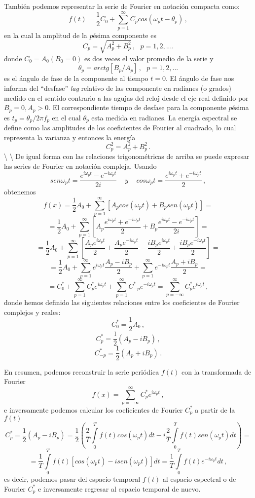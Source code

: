 \documentclass[
]{agujournal2019}
\begin{document}
También podemos representar la serie de Fourier en notación compacta
como:
\[f(t)=\frac{1}{2}C_0 +\sum\limits^\infty_{p=1}C_p cos(\omega_p t - \theta_p)\,,\]
en la cual la amplitud de la \(p\)ésima componente es
\[C_p=\sqrt{A_p^2+B_p^2}\,,\,\,\,\,p=1,2,....\] donde
\(C_0=A_0 (B_0=0)\) es dos veces el valor promedio de la serie y
\[\theta_p=arctg[B_p/A_p]\,,\,\,\,\,p=1,2,...\] es el ángulo de fase de
la componente al tiempo \(t=0\). El ángulo de fase nos informa del
``desfase'' \emph{lag} relativo de las componente en radianes (o grados)
medido en el sentido contrario a las agujas del reloj desde el eje real
definido por \(B_p=0, A_p>0\). El correspondiente tiempo de desfase para
la componente \(p\)ésima es \(t_p=\theta_p/2\pi f_p\) en el cual
\(\theta_p\) esta medida en radianes. La energía espectral se define
como las amplitudes de los coeficientes de Fourier al cuadrado, lo cual
representa la varianza y entonces la energía \[C^2_p=A_p^2 + B_p^2\,.\]
\textbackslash{} \textbackslash{} De igual forma con las relaciones
trigonométricas de arriba se puede expresar las series de Fourier en
notación compleja. Usando
\[sen\omega_p t=\frac{e^{i\omega_pt}-e^{-i\omega_pt}}{2i}\,\,\,\,\,\,\,y\,\,\,\,\,\,\,
cos\omega_p t=\frac{e^{i\omega_pt}+e^{-i\omega_pt}}{2}\,,\] obtenemos
\[f(x)=\frac{1}{2}A_0 +\sum\limits^\infty_{p=1}[A_p cos(\omega_p t) + B_p sen(\omega_p t)]=\]
\[=\frac{1}{2}A_0 +\sum\limits^\infty_{p=1}\left[ A_p \frac{e^{i\omega_pt}+e^{-i\omega_pt}}{2} + B_p \frac{e^{i\omega_pt}-e^{-i\omega_pt}}{2i}\right]=\]
\[=\frac{1}{2}A_0+\sum\limits^\infty_{p=1}\left[\frac{A_p e^{i\omega_p t}}{2} + \frac{A_p e^{-i\omega_p t}}{2} -
\frac{iB_p e^{i\omega_p t}}{2} + \frac{iB_p e^{-i\omega_p t}}{2} \right]=\]
\[=\frac{1}{2}A_0+\sum\limits^\infty_{p=1} e^{i\omega_p t}\frac{A_p-iB_p}{2} +
                  \sum\limits^\infty_{p=1} e^{-i\omega_p t}\frac{A_p+iB_p}{2}=\]
\[=C^*_0 + \sum\limits^\infty_{p=1}C^*_pe^{i\omega_p t} + \sum\limits^\infty_{p=1}C^*_{-p} e^{-i\omega_p t}=
\sum\limits^\infty_{p=-\infty} C^*_p e^{i\omega_p t}\,,\] donde hemos
definido las siguientes relaciones entre los coeficientes de Fourier
complejos y reales: \[C^*_0=\frac{1}{2}A_0\,,\]
\[C^*_p=\frac{1}{2}(A_p-iB_p)\,,\] \[C^*_{-p}=\frac{1}{2}(A_p+iB_p)\,.\]

En resumen, podemos reconstruir la serie periódica \(f(t)\) con la
transformada de Fourier
\[f(x)=\sum\limits^\infty_{p=-\infty} C^*_p e^{i\omega_p t}\,,\] e
inversamente podemos calcular los coeficientes de Fourier \(C^*_p\) a
partir de la \(f(t)\)
\[C^*_p=\frac{1}{2}(A_p-iB_p)=\frac{1}{2}\left(\frac{2}{T}\int\limits_0^{T} f(t) cos(\omega_p t) dt -
                                             i \frac{2}{T}\int\limits_0^{T} f(t) sen(\omega_p t) dt \right)=\]
\[=\frac{1}{T}\int\limits_0^{T} f(t) [cos(\omega_p t) - isen(\omega_p t) ]dt = \frac{1}{T}\int\limits_0^{T} f(t) e^{-i \omega_p t} dt\,,\]
es decir, podemos pasar del espacio temporal \(f(t)\) al espacio
espectral o de Fourier \(C^*_p\) e inversamente regresar al espacio
temporal de nuevo.
\end{document}

